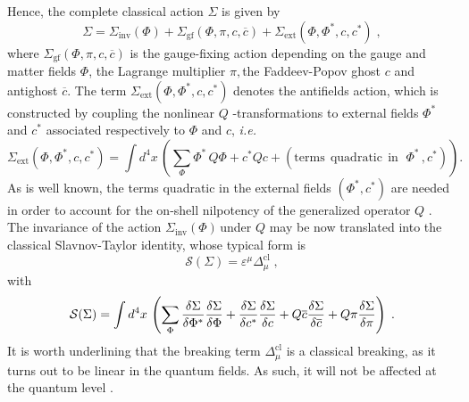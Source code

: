 \documentclass[a4paper,12pt]{article}
\begin{document}
Hence, the complete classical action $\Sigma $ is given by 
\begin{equation}
\Sigma =\Sigma _{\mathrm{inv}}(\Phi )+\Sigma _{\mathrm{gf}}(\Phi ,\pi ,c,%
\overline{c})+\Sigma _{\mathrm{ext}}(\Phi ,\Phi ^{*},c,c^{*})\;,
\label{totac}
\end{equation}
where $\Sigma _{\mathrm{gf}}(\Phi ,\pi ,c,\overline{c})$ is the gauge-fixing
action depending on the gauge and matter fields $\Phi $, the Lagrange
multiplier $\pi ,$the Faddeev-Popov ghost $c$ and antighost $\overline{c}$.
The term $\Sigma _{\mathrm{ext}}(\Phi ,\Phi ^{*},c,c^{*})$ denotes the
antifields action, which is constructed by coupling the nonlinear $Q$%
-transformations to external fields $\Phi ^{*}$ and $c^{*}$ associated
respectively to $\Phi $ and $c$, \textit{i.e.} 
\begin{equation}
\Sigma _{\mathrm{ext}}(\Phi ,\Phi ^{*},c,c^{*})=\int d^{4}x\,\left(
\sum_{\Phi }\Phi ^{*}\,Q\Phi +c^{*}Qc+\left( \mathrm{terms\,\;quadratic\,%
\;in\,\;\,}\Phi ^{*}\,\mathrm{,}c^{*}\right) \right) \mathrm{.}
\label{extac}
\end{equation}
As is well known, the terms quadratic in the external fields $\left( \Phi
^{*},c^{*}\right) $ are needed in order to account for the on-shell
nilpotency of the generalized operator $Q$ \cite{n4,mg,mp}. The invariance
of the action $\Sigma _{\mathrm{inv}}(\Phi )\,$under $Q$ may be now
translated into the classical Slavnov-Taylor identity, whose typical form is 
\cite{vit,n2,n41} 
\begin{equation}
\mathcal{S}(\Sigma )=\varepsilon ^{\mu }\Delta _{\mu }^{\mathrm{cl}}\;,
\label{st}
\end{equation}
with 
\begin{equation}
\mathcal{S}(\Sigma )=\int d^{4}x\,\left( \sum_{\Phi }\frac{\delta \Sigma }{%
\delta \Phi ^{*}}\frac{\delta \Sigma }{\delta \Phi }+\frac{\delta \Sigma }{%
\delta c^{*}}\frac{\delta \Sigma }{\delta c}+Q\overline{c}\frac{\delta
\Sigma }{\delta \overline{c}}+Q\pi \frac{\delta \Sigma }{\delta \pi }\right)
\;.
\end{equation}
It is worth underlining that the breaking term $\Delta _{\mu }^{\mathrm{cl}}$
is a classical breaking, as it turns out to be linear in the quantum fields.
As such, it will not be affected at the quantum level \cite{book}.
\end{document}
